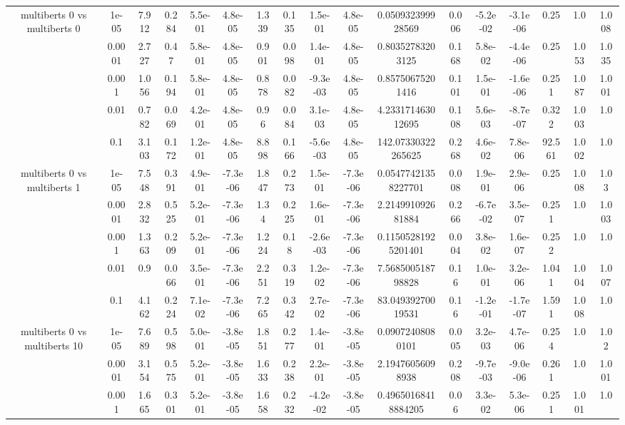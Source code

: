 \begin{tabular}{|c|c|c|c|c|c|c|c|c|c|c|c|c|c|c|c|c|}
\hline
\multirow{5}{*}{multiberts 0 vs multiberts 0} & 1e-05 & 7.912 & 0.284 & 5.5e-01 & 4.8e-05 & 1.339 & 0.135 & 1.5e-01 & 4.8e-05 & 0.050932399928569 & 0.006 & -5.2e-02 & -3.1e-06 & 0.25 & 1.0 & 1.008 \\
 & 0.0001 & 2.727 & 0.47 & 5.8e-01 & 4.8e-05 & 0.901 & 0.098 & 1.4e-01 & 4.8e-05 & 0.80352783203125 & 0.168 & 5.8e-02 & -4.4e-06 & 0.25 & 1.053 & 1.035 \\
 & 0.001 & 1.056 & 0.194 & 5.8e-01 & 4.8e-05 & 0.878 & 0.082 & -9.3e-03 & 4.8e-05 & 0.85750675201416 & 0.101 & 1.5e-01 & -1.6e-06 & 0.251 & 1.087 & 1.001 \\
 & 0.01 & 0.782 & 0.069 & 4.2e-01 & 4.8e-05 & 0.96 & 0.084 & 3.1e-03 & 4.8e-05 & 4.233171463012695 & 0.108 & 5.6e-03 & -8.7e-07 & 0.322 & 1.003 & 1.0 \\
 & 0.1 & 3.103 & 0.172 & 1.2e-01 & 4.8e-05 & 8.898 & 0.166 & -5.6e-03 & 4.8e-05 & 142.07330322265625 & 0.268 & 4.6e-02 & 7.8e-06 & 92.561 & 1.002 & 1.0 \\
\hline
\multirow{5}{*}{multiberts 0 vs multiberts 1} & 1e-05 & 7.548 & 0.391 & 4.9e-01 & -7.3e-06 & 1.847 & 0.273 & 1.5e-01 & -7.3e-06 & 0.05477421358227701 & 0.008 & 1.9e-01 & 2.9e-06 & 0.25 & 1.008 & 1.03 \\
 & 0.0001 & 2.832 & 0.525 & 5.2e-01 & -7.3e-06 & 1.34 & 0.225 & 1.6e-01 & -7.3e-06 & 2.214991092681884 & 0.266 & -6.7e-02 & 3.5e-07 & 0.251 & 1.0 & 1.003 \\
 & 0.001 & 1.363 & 0.209 & 5.2e-01 & -7.3e-06 & 1.224 & 0.18 & -2.6e-03 & -7.3e-06 & 0.11505281925201401 & 0.004 & 3.8e-02 & 1.6e-07 & 0.252 & 1.0 & 1.0 \\
 & 0.01 & 0.9 & 0.066 & 3.5e-01 & -7.3e-06 & 2.251 & 0.319 & 1.2e-02 & -7.3e-06 & 7.568500518798828 & 0.16 & 1.0e-01 & 3.2e-06 & 1.041 & 1.004 & 1.007 \\
 & 0.1 & 4.162 & 0.224 & 7.1e-02 & -7.3e-06 & 7.265 & 0.342 & 2.7e-02 & -7.3e-06 & 83.04939270019531 & 0.16 & -1.2e-01 & -1.7e-07 & 1.591 & 1.008 & 1.0 \\
\hline
\multirow{5}{*}{multiberts 0 vs multiberts 10} & 1e-05 & 7.689 & 0.598 & 5.0e-01 & -3.8e-05 & 1.851 & 0.277 & 1.4e-01 & -3.8e-05 & 0.09072408080101 & 0.005 & 3.2e-03 & 4.7e-06 & 0.254 & 1.0 & 1.02 \\
 & 0.0001 & 3.154 & 0.575 & 5.2e-01 & -3.8e-05 & 1.633 & 0.238 & 2.2e-01 & -3.8e-05 & 2.19476056098938 & 0.208 & -9.7e-03 & -9.0e-06 & 0.261 & 1.0 & 1.001 \\
 & 0.001 & 1.665 & 0.301 & 5.2e-01 & -3.8e-05 & 1.658 & 0.232 & -4.2e-02 & -3.8e-05 & 0.49650168418884205 & 0.06 & 3.3e-02 & 5.3e-06 & 0.251 & 1.001 & 1.0 \\

\end{tabular}
